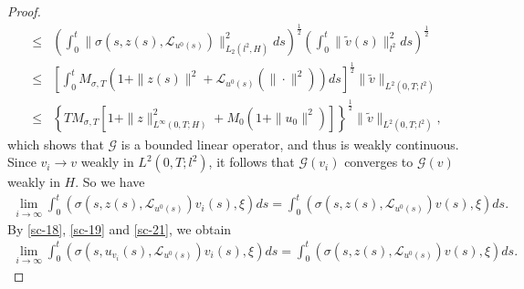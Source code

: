 \documentclass[10pt,a4paper]{amsart}
\def\leq{\leqslant}
\begin{document}
\begin{proof}
\begin{align}
        \leq &
        \left( \int_0^t \| \sigma(s, z(s), \mathcal{L}_{u^0(s)} ) \|_{L_2(l^2, H)}^2 ds
        \right)^{\frac{1}{2}}
        \left( \int_0^t \| \tilde{v}(s) \|_{l^2}^2 ds
        \right)^{\frac{1}{2}} \nonumber \\
        \leq &
        \left[ \int_0^t M_{\sigma,T}
        \left( 1 + \|z(s)\|^2
        + \mathcal{L}_{u^0(s)}(\|\cdot\|^2)
        \right) ds
        \right]^{\frac{1}{2}}
        \| \tilde{v} \|_{L^2(0,T; l^2)} \nonumber \\
        \leq &
        \left\{ TM_{\sigma,T}
        \left[ 1 + \|z\|_{L^\infty(0,T;H)}^2
        + M_0 \left( 1 + \|u_0\|^2 \right)
        \right]
        \right\}^{\frac{1}{2}}
        \| \tilde{v} \|_{L^2(0,T; l^2)},
    \end{align}
    which shows that
    $\mathcal{G}$ is a bounded linear operator, and thus
    is weakly continuous.
    Since $v_i \rightarrow v$ weakly in $L^2(0, T; l^2)$,
    it follows that
    $\mathcal{G}(v_i)$ converges to
    $\mathcal{G}(v)$
    weakly
    in $H$.
    So we have
    \begin{align} \label{sc-21}
        \lim_{i \to  \infty}
        \int_0^t
        \left( \sigma(s, z(s), \mathcal{L}_{u^0(s)} ) v_i(s), \xi \right) ds
        = \int_0^t
        \left( \sigma(s, z(s), \mathcal{L}_{u^0(s)} ) v(s), \xi \right) ds.
    \end{align}
    By \eqref{sc-18}, \eqref{sc-19} and \eqref{sc-21},
    we obtain
    \begin{align} \label{sc-22}
        \lim_{i \to \infty}
        \int_0^t \left(\sigma(s, u_{v_i}(s), \mathcal{L}_{u^0(s)} ) v_i(s), \xi \right) ds
        = \int_0^t
        \left( \sigma(s, z(s), \mathcal{L}_{u^0(s)} ) v(s), \xi \right) ds.
    \end{align}



\end{proof}
\end{document}
